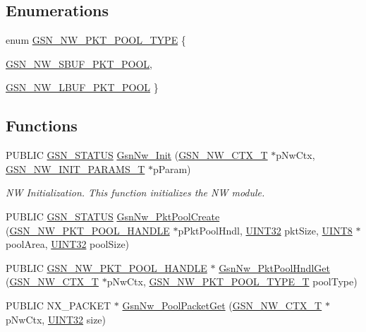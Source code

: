 \subsection*{Enumerations}
\begin{DoxyCompactItemize}
\item 
enum \hyperlink{a00532_a75dd2f792a21a6b414daffe98e4b656b}{GSN\_\-NW\_\-PKT\_\-POOL\_\-TYPE} \{ \par
\hyperlink{a00532_a75dd2f792a21a6b414daffe98e4b656baa10a1e47e3cffb5cf03841925e7ca4f1}{GSN\_\-NW\_\-SBUF\_\-PKT\_\-POOL}, 
\par
\hyperlink{a00532_a75dd2f792a21a6b414daffe98e4b656ba17d1ee18e10830176ee8135e0a764d6d}{GSN\_\-NW\_\-LBUF\_\-PKT\_\-POOL}
 \}
\end{DoxyCompactItemize}
\subsection*{Functions}
\begin{DoxyCompactItemize}
\item 
PUBLIC \hyperlink{a00660_gada5951904ac6110b1fa95e51a9ddc217}{GSN\_\-STATUS} \hyperlink{a00670_ga86680611203d42252fc6f05608b7d75d}{GsnNw\_\-Init} (\hyperlink{a00164}{GSN\_\-NW\_\-CTX\_\-T} $\ast$pNwCtx, \hyperlink{a00165}{GSN\_\-NW\_\-INIT\_\-PARAMS\_\-T} $\ast$pParam)
\begin{DoxyCompactList}\small\item\em NW Initialization. This function initializes the NW module. \end{DoxyCompactList}\item 
PUBLIC \hyperlink{a00660_gada5951904ac6110b1fa95e51a9ddc217}{GSN\_\-STATUS} \hyperlink{a00532_aaf3761589da5907fb80f1597fcbcc842}{GsnNw\_\-PktPoolCreate} (\hyperlink{a00532_afccc5835aa5e2916600678de68186848}{GSN\_\-NW\_\-PKT\_\-POOL\_\-HANDLE} $\ast$pPktPoolHndl, \hyperlink{a00660_gae1e6edbbc26d6fbc71a90190d0266018}{UINT32} pktSize, \hyperlink{a00660_gab27e9918b538ce9d8ca692479b375b6a}{UINT8} $\ast$poolArea, \hyperlink{a00660_gae1e6edbbc26d6fbc71a90190d0266018}{UINT32} poolSize)
\item 
PUBLIC \hyperlink{a00532_afccc5835aa5e2916600678de68186848}{GSN\_\-NW\_\-PKT\_\-POOL\_\-HANDLE} $\ast$ \hyperlink{a00532_ae993be1fc8812d9a500164aecdbfebf3}{GsnNw\_\-PktPoolHndlGet} (\hyperlink{a00164}{GSN\_\-NW\_\-CTX\_\-T} $\ast$pNwCtx, \hyperlink{a00532_a777bb6c45bce65d3ede8311de122d451}{GSN\_\-NW\_\-PKT\_\-POOL\_\-TYPE\_\-T} poolType)
\item 
PUBLIC NX\_\-PACKET $\ast$ \hyperlink{a00532_a3c21661b119048d9cb48f42c09d2a45f}{GsnNw\_\-PoolPacketGet} (\hyperlink{a00164}{GSN\_\-NW\_\-CTX\_\-T} $\ast$pNwCtx, \hyperlink{a00660_gae1e6edbbc26d6fbc71a90190d0266018}{UINT32} size)
\end{DoxyCompactItemize}



